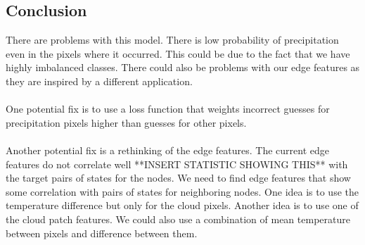 \subsection{Conclusion}

There are problems with this model. There is low probability of precipitation even in the pixels where it occurred. This could be due to the fact that we have highly imbalanced classes. There could also be problems with our edge features as they are inspired by a different application. \\
\\
One potential fix is to use a loss function that weights incorrect guesses for precipitation pixels higher than guesses for other pixels. \\
\\
Another potential fix is a rethinking of the edge features. The current edge features do not correlate well **INSERT STATISTIC SHOWING THIS** with the target pairs of states for the nodes. We need to find edge features that show some correlation with pairs of states for neighboring nodes. One idea is to use the temperature difference but only for the cloud pixels. Another idea is to use one of the cloud patch features. We could also use a combination of mean temperature between pixels and difference between them. 


